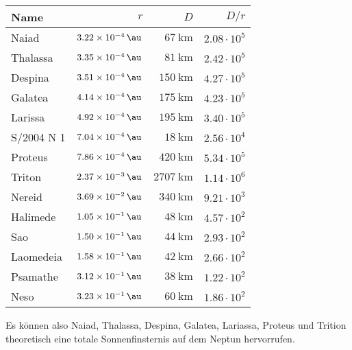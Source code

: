 \documentclass[a4paper,german,12pt,smallheadings]{scrartcl}
\begin{document}
\begin{enumerate}[a)]
    \begin{tabular}{l|r|r|r}
      Name       & $r$                 & $D$                      & $D/r$ \\
      \hline
      Naiad      & $\SI{3.22e-4}{\au}$ & $\SI{67}{\kilo\meter}$   & $2.08 \cdot 10^5$ \\
      Thalassa   & $\SI{3.35e-4}{\au}$ & $\SI{81}{\kilo\meter}$   & $2.42 \cdot 10^5$ \\
      Despina    & $\SI{3.51e-4}{\au}$ & $\SI{150}{\kilo\meter}$  & $4.27 \cdot 10^5$ \\
      Galatea    & $\SI{4.14e-4}{\au}$ & $\SI{175}{\kilo\meter}$  & $4.23 \cdot 10^5$ \\
      Larissa    & $\SI{4.92e-4}{\au}$ & $\SI{195}{\kilo\meter}$  & $3.40 \cdot 10^5$ \\
      S/2004 N 1 & $\SI{7.04e-4}{\au}$ & $\SI{18}{\kilo\meter}$   & $2.56 \cdot 10^4$ \\
      Proteus    & $\SI{7.86e-4}{\au}$ & $\SI{420}{\kilo\meter}$  & $5.34 \cdot 10^5$ \\
      Triton     & $\SI{2.37e-3}{\au}$ & $\SI{2707}{\kilo\meter}$ & $1.14 \cdot 10^6$ \\
      Nereid     & $\SI{3.69e-2}{\au}$ & $\SI{340}{\kilo\meter}$  & $9.21 \cdot 10^3$ \\
      Halimede   & $\SI{1.05e-1}{\au}$ & $\SI{48}{\kilo\meter}$   & $4.57 \cdot 10^2$ \\
      Sao        & $\SI{1.50e-1}{\au}$ & $\SI{44}{\kilo\meter}$   & $2.93 \cdot 10^2$ \\
      Laomedeia  & $\SI{1.58e-1}{\au}$ & $\SI{42}{\kilo\meter}$   & $2.66 \cdot 10^2$ \\
      Psamathe   & $\SI{3.12e-1}{\au}$ & $\SI{38}{\kilo\meter}$   & $1.22 \cdot 10^2$ \\
      Neso       & $\SI{3.23e-1}{\au}$ & $\SI{60}{\kilo\meter}$   & $1.86 \cdot 10^2$ \\
    \end{tabular}

    Es können also Naiad, Thalassa, Despina, Galatea, Lariassa, Proteus und
    Trition theoretisch eine totale Sonnenfinsternis auf dem Neptun
    hervorrufen.
\end{enumerate}

\begin{landscape}
  
\end{landscape}
\end{document}
